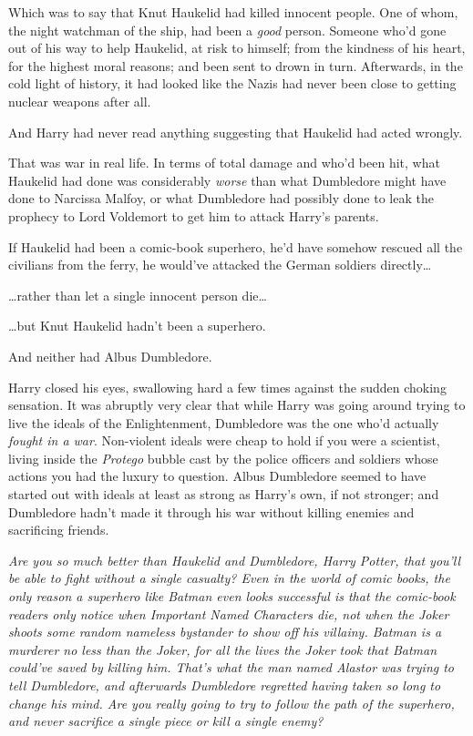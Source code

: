 Which was to say that Knut Haukelid had killed innocent people. One of whom, the night watchman of the ship, had been a \emph{good} person. Someone who’d gone out of his way to help Haukelid, at risk to himself; from the kindness of his heart, for the highest moral reasons; and been sent to drown in turn. Afterwards, in the cold light of history, it had looked like the Nazis had never been close to getting nuclear weapons after all.

And Harry had never read anything suggesting that Haukelid had acted wrongly.

That was war in real life. In terms of total damage and who’d been hit, what Haukelid had done was considerably \emph{worse} than what Dumbledore might have done to Narcissa Malfoy, or what Dumbledore had possibly done to leak the prophecy to Lord Voldemort to get him to attack Harry’s parents.

If Haukelid had been a comic-book superhero, he’d have somehow rescued all the civilians from the ferry, he would’ve attacked the German soldiers directly…

…rather than let a single innocent person die…

…but Knut Haukelid hadn’t been a superhero.

And neither had Albus Dumbledore.

Harry closed his eyes, swallowing hard a few times against the sudden choking sensation. It was abruptly very clear that while Harry was going around trying to live the ideals of the Enlightenment, Dumbledore was the one who’d actually \emph{fought in a war}. Non-violent ideals were cheap to hold if you were a scientist, living inside the \emph{Protego} bubble cast by the police officers and soldiers whose actions you had the luxury to question. Albus Dumbledore seemed to have started out with ideals at least as strong as Harry’s own, if not stronger; and Dumbledore hadn’t made it through his war without killing enemies and sacrificing friends.

\emph{Are you so much better than Haukelid and Dumbledore, Harry Potter, that you’ll be able to fight without a single casualty? Even in the world of comic books, the only reason a superhero like Batman even \emph{looks} successful is that the comic-book readers only notice when Important Named Characters die, not when the Joker shoots some random nameless bystander to show off his villainy. Batman is a murderer no less than the Joker, for all the lives the Joker took that Batman could’ve saved by killing him. That’s what the man named Alastor was trying to tell Dumbledore, and afterwards Dumbledore regretted having taken so long to change his mind. Are you really going to try to follow the path of the superhero, and never sacrifice a single piece or kill a single enemy?}

